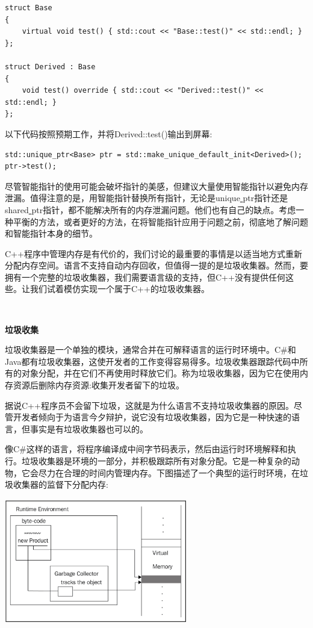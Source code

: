 \begin{lstlisting}[caption={}]
struct Base
{
	virtual void test() { std::cout << "Base::test()" << std::endl; }
};

struct Derived : Base
{
	void test() override { std::cout << "Derived::test()" << std::endl; }
};
\end{lstlisting}

以下代码按照预期工作，并将Derived::test()输出到屏幕:\par

\begin{lstlisting}[caption={}]
std::unique_ptr<Base> ptr = std::make_unique_default_init<Derived>();
ptr->test();
\end{lstlisting}

尽管智能指针的使用可能会破坏指针的美感，但建议大量使用智能指针以避免内存泄漏。值得注意的是，用智能指针替换所有指针，无论是unique\underline{ }ptr指针还是shared\underline{ }ptr指针，都不能解决所有的内存泄漏问题。他们也有自己的缺点。考虑一种平衡的方法，或者更好的方法，在将智能指针应用于问题之前，彻底地了解问题和智能指针本身的细节。 \par
C++程序中管理内存是有代价的，我们讨论的最重要的事情是以适当地方式重新分配内存空间。语言不支持自动内存回收，但值得一提的是垃圾收集器。然而，要拥有一个完整的垃圾收集器，我们需要语言级的支持，但C++没有提供任何这些。让我们试着模仿实现一个属于C++的垃圾收集器。 \par

\noindent\textbf{}\ \par
\textbf{垃圾收集} \ \par
垃圾收集器是一个单独的模块，通常合并在可解释语言的运行时环境中。C\#和Java都有垃圾收集器，这使开发者的工作变得容易得多。垃圾收集器跟踪代码中所有的对象分配，并在它们不再使用时释放它们。称为垃圾收集器，因为它在使用内存资源后删除内存资源:收集开发者留下的垃圾。\par
据说C++程序员不会留下垃圾，这就是为什么语言不支持垃圾收集器的原因。尽管开发者倾向于为语言今夕辩护，说它没有垃圾收集器，因为它是一种快速的语言，但事实是有垃圾收集器也可以的。 \par
像C\#这样的语言，将程序编译成中间字节码表示，然后由运行时环境解释和执行。垃圾收集器是环境的一部分，并积极跟踪所有对象分配。它是一种复杂的动物，它会尽力在合理的时间内管理内存。下图描述了一个典型的运行时环境，在垃圾收集器的监督下分配内存: \par

\begin{center}
	\includegraphics[width=0.6\textwidth]{content/Section-1/Chapter-5/14}
\end{center}

